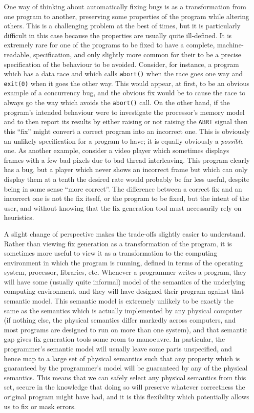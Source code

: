 One way of thinking about automatically fixing bugs is as a
transformation from one program to another, preserving some properties
of the program while altering others.  This is a challenging problem
at the best of times, but it is particularly difficult in this case
because the properties are usually quite ill-defined.  It is extremely
rare for one of the programs to be fixed to have a complete,
machine-readable, specification, and only slightly more common for
their to be a precise specification of the behaviour to be avoided.
Consider, for instance, a program which has a data race and which
calls \texttt{abort()} when the race goes one way and \texttt{exit(0)}
when it goes the other way.  This would appear, at first, to be an
obvious example of a concurrency bug, and the obvious fix would be to
cause the race to always go the way which avoids the \texttt{abort()}
call.  On the other hand, if the program's intended behaviour were to
investigate the processor's memory model and to then report its
results by either raising or not raising the \texttt{ABRT} signal then
this ``fix'' might convert a correct program into an incorrect one.
This is obviously an unlikely specification for a program to have; it
is equally obviously a \emph{possible} one.  As another example,
consider a video player which sometimes displays frames with a few bad
pixels due to bad thread interleaving.  This program clearly has a
bug, but a player which never shows an incorrect frame but which can
only display them at a tenth the desired rate would probably be far
less useful, despite being in some sense ``more correct''.  The
difference between a correct fix and an incorrect one is not the fix
itself, or the program to be fixed, but the intent of the user, and
without knowing that the fix generation tool must necessarily rely on
heuristics.

A slight change of perspective makes the trade-offs slightly easier to
understand.  Rather than viewing fix generation as a transformation of
the program, it is sometimes more useful to view it as a
transformation to the computing environment in which the program is
running, defined in terms of the operating system, processor,
libraries, etc.  Whenever a programmer writes a program, they will
have some (usually quite informal) model of the semantics of the
underlying computing environment, and they will have designed their
program against that semantic model.  This semantic model is extremely
unlikely to be exactly the same as the semantics which is actually
implemented by any physical computer (if nothing else, the physical
semantics differ markedly across computers, and most programs are
designed to run on more than one system), and that semantic gap gives
fix generation tools some room to manoeuvre.  In particular, the
programmer's semantic model will usually leave some parts unspecified,
and hence map to a large set of physical semantics such that any
property which is guaranteed by the programmer's model will be
guaranteed by any of the physical semantics.  This means that we can
safely select any physical semantics from this set, secure in the
knowledge that doing so will preserve whatever correctness the
original program might have had, and it is this flexibility which
potentially allows us to fix or mask errors.

